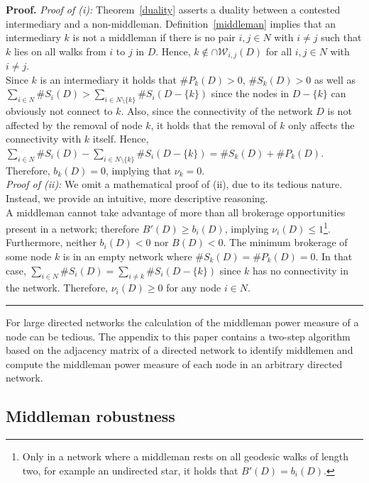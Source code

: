 \documentclass[11pt,fleqn]{article}
\newenvironment{proof}[1][Proof]{\noindent \textbf{#1.} }{\hfill
\rule{0.5em}{0.5em}}
\begin{document}
\begin{proof}
\emph{Proof of (i):}
Theorem~\ref{duality} asserts a duality between a contested intermediary and a non-middleman. Definition~\ref{middleman} implies that an intermediary $k$ is not a middleman if there is no pair $i,j \in N$ with $i \neq j$ such that $k$ lies on all walks from $i$ to $j$ in $D$. Hence, $k \notin \cap \mathcal{W}_{i,j}(D)$ for all $i,j \in N$ with $i \neq j$.
\\
Since $k$ is an intermediary it holds that $\# P_{k}(D) > 0$, $\# S_{k}(D) > 0$ as well as $\sum_{i \in N} \# S_{i}(D) > \sum_{i \in N \setminus \{k\}} \# S_{i}(D - \{k\})$ since the nodes in $D - \{k\}$ can obviously not connect to $k$. Also, since the connectivity of the network $D$ is not affected by the removal of node $k$, it holds that the removal of $k$ only affects the connectivity with $k$ itself. Hence, $\sum_{i \in N} \# S_{i}(D) - \sum_{i \in N \setminus \{k\}} \# S_{i}(D - \{k\}) = \# S_{k}(D) + \# P_{k}(D)$. Therefore, $b_k (D) =0$, implying that $\nu_{k} = 0$.
\\[1.5ex]
\emph{Proof of (ii):}
We omit a mathematical proof of (ii), due to its tedious nature. Instead, we provide an intuitive, more descriptive reasoning. 
\\
A middleman cannot take advantage of more than all brokerage opportunities present in a network; therefore $B'(D) \geqslant b_{i}(D)$, implying $\nu_{i}(D) \leqslant 1$\footnote{Only in a network where a middleman rests on all geodesic walks of length two, for example an undirected star, it holds that $B'(D) = b_{i}(D)$.}.
\\
Furthermore, neither $b_{i}(D) < 0$ nor $B(D) < 0$. The minimum brokerage of some node $k$ is in an empty network where $\# S_{k}(D) = \# P_{k}(D) = 0$. In that case, $\sum_{i \in N} \# S_{i}(D) = \sum_{i \neq k} \# S_{i}(D - \{k\})$ since $k$ has no connectivity in the network. Therefore, $\nu_i (D) \geqslant 0$ for any node $i \in N$.
\end{proof}

\medskip\noindent For large directed networks the calculation of the middleman power measure of a node can be tedious. The appendix to this paper contains a two-step algorithm based on the adjacency matrix of a directed network to identify middlemen and compute the middleman power measure of each node in an arbitrary directed network.

\subsection{Middleman robustness}
\end{document}
